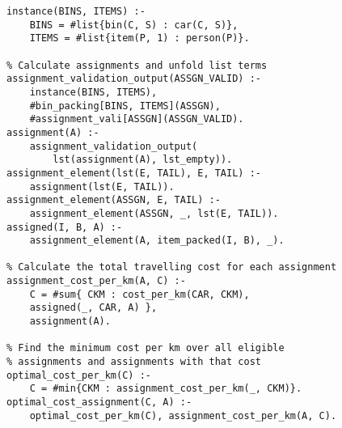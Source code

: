 \begin{example}
\begin{lstlisting}[style=asp-code, label={lst:bin-packing-main}, caption={Main Program}]
% Create input instance for bin-packing module
instance(BINS, ITEMS) :- 
	BINS = #list{bin(C, S) : car(C, S)}, 
	ITEMS = #list{item(P, 1) : person(P)}.

% Calculate assignments and unfold list terms
assignment_validation_output(ASSGN_VALID) :- 
	instance(BINS, ITEMS), 
	#bin_packing[BINS, ITEMS](ASSGN), 
	#assignment_vali[ASSGN](ASSGN_VALID).
assignment(A) :- 
	assignment_validation_output(
		lst(assignment(A), lst_empty)).
assignment_element(lst(E, TAIL), E, TAIL) :- 
	assignment(lst(E, TAIL)).
assignment_element(ASSGN, E, TAIL) :- 
	assignment_element(ASSGN, _, lst(E, TAIL)).
assigned(I, B, A) :- 
	assignment_element(A, item_packed(I, B), _).

% Calculate the total travelling cost for each assignment
assignment_cost_per_km(A, C) :- 
	C = #sum{ CKM : cost_per_km(CAR, CKM), 
	assigned(_, CAR, A) }, 
	assignment(A).

% Find the minimum cost per km over all eligible 
% assignments and assignments with that cost
optimal_cost_per_km(C) :- 
	C = #min{CKM : assignment_cost_per_km(_, CKM)}.
optimal_cost_assignment(C, A) :- 
	optimal_cost_per_km(C), assignment_cost_per_km(A, C).	
\end{lstlisting}
\end{example}

